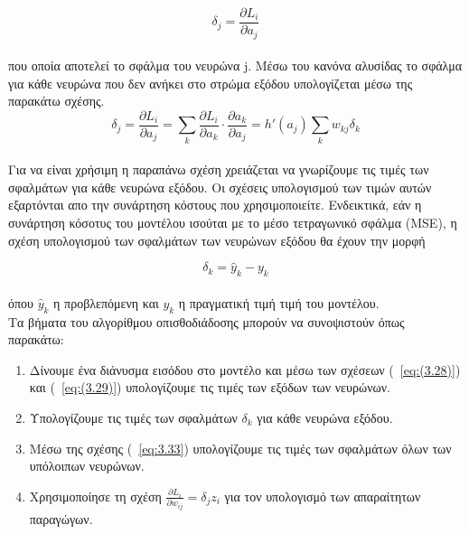 \documentclass[12pt]{article}
\numberwithin{equation}{section}
\begin{document}
\begin{equation}
\delta_j = \frac{\partial L_i}{\partial a_j}
\end{equation}\\

\noindent που οποία αποτελεί το σφάλμα του νευρώνα j.  Μέσω του κανόνα αλυσίδας το σφάλμα για κάθε νευρώνα που δεν ανήκει στο στρώμα εξόδου  υπολογίζεται μέσω της παρακάτω σχέσης.\\

\begin{equation}
\delta_j = \frac{\partial L_i}{\partial a_j} = \sum_k \frac{\partial L_i}{\partial a_k} \cdot \frac{\partial a_k}{\partial a_j} = h'(a_j) \sum_k w_{kj} \delta_k
\label{eq:3.33}
\end{equation}\\

\noindent Για να είναι χρήσιμη η παραπάνω σχέση χρειάζεται να γνωρίζουμε τις τιμές των σφαλμάτων για κάθε νευρώνα εξόδου. Οι σχέσεις υπολογισμού των τιμών αυτών εξαρτόνται απο την συνάρτηση κόστους που χρησιμοποιείτε. Ενδεικτικά, εάν η συνάρτηση κόσοτυς του μοντέλου ισούται με το μέσο τετραγωνικό σφάλμα (MSE), η σχέση υπολογισμού των σφαλμάτων των νευρώνων εξόδου θα έχουν την μορφή

\begin{equation}
\delta_k = \hat{y}_k - y_k
\end{equation}\\

\noindent όπου \(\hat{y}_k\) η προβλεπόμενη και \(y_k\) η πραγματική τιμή τιμή του μοντέλου.\\

\noindent Τα βήματα του αλγορίθμου οπισθοδιάδοσης μπορούν να συνοψιστούν όπως παρακάτω:

\begin{enumerate}
  \item Δίνουμε ένα διάνυσμα εισόδου στο μοντέλο και μέσω των σχέσεων (~\ref{eq:(3.28)}) και (~\ref{eq:(3.29)}) υπολογίζουμε τις τιμές των εξόδων των νευρώνων.
    \item Υπολογίζουμε τις τιμές των σφαλμάτων \(\delta_k\) για κάθε νευρώνα εξόδου.
    \item Μέσω της σχέσης (~\ref{eq:3.33}) υπολογίζουμε τις τιμές των σφαλμάτων όλων των υπόλοιπων νευρώνων.
    \item Χρησιμοποίησε τη σχέση \(\frac{\partial L_i}{\partial w_{ij}}=\delta_j z_i\) για τον υπολογισμό των απαραίτητων παραγώγων.
\end{enumerate}
\end{document}
